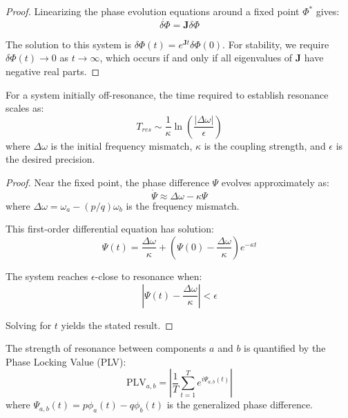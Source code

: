\begin{proof}
Linearizing the phase evolution equations around a fixed point $\Phi^*$ gives:
\begin{equation}
\dot{\delta\Phi} = \mathbf{J} \delta\Phi
\end{equation}

The solution to this system is $\delta\Phi(t) = e^{\mathbf{J}t} \delta\Phi(0)$. For stability, we require $\delta\Phi(t) \to 0$ as $t \to \infty$, which occurs if and only if all eigenvalues of $\mathbf{J}$ have negative real parts.
\end{proof}

\begin{theorem}
For a system initially off-resonance, the time required to establish resonance scales as:
\begin{equation}
T_{res} \sim \frac{1}{\kappa} \ln\left(\frac{|\Delta\omega|}{\epsilon}\right)
\end{equation}
where $\Delta\omega$ is the initial frequency mismatch, $\kappa$ is the coupling strength, and $\epsilon$ is the desired precision.
\end{theorem}

\begin{proof}
Near the fixed point, the phase difference $\Psi$ evolves approximately as:
\begin{equation}
\dot{\Psi} \approx \Delta\omega - \kappa\Psi
\end{equation}
where $\Delta\omega = \omega_a - (p/q)\omega_b$ is the frequency mismatch.

This first-order differential equation has solution:
\begin{equation}
\Psi(t) = \frac{\Delta\omega}{\kappa} + \left(\Psi(0) - \frac{\Delta\omega}{\kappa}\right)e^{-\kappa t}
\end{equation}

The system reaches $\epsilon$-close to resonance when:
\begin{equation}
\left|\Psi(t) - \frac{\Delta\omega}{\kappa}\right| < \epsilon
\end{equation}

Solving for $t$ yields the stated result.
\end{proof}

\begin{definition}
The strength of resonance between components $a$ and $b$ is quantified by the Phase Locking Value (PLV):
\begin{equation}
\text{PLV}_{a,b} = \left|\frac{1}{T} \sum_{t=1}^T e^{i\Psi_{a,b}(t)}\right|
\end{equation}
where $\Psi_{a,b}(t) = p\phi_a(t) - q\phi_b(t)$ is the generalized phase difference.
\end{definition}

